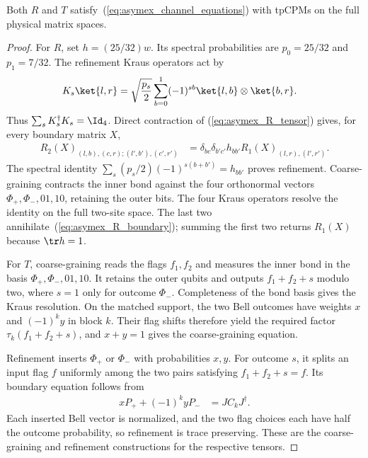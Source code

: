 \begin{lemma}
    \label{thm:asymex_physical_rfp}
    \leanok
    Both $R$ and $T$ satisfy~(\ref{eq:asymex_channel_equations}) with tpCPMs
    on the full physical matrix spaces.
\end{lemma}
\begin{proof}
    \leanok
    For $R$, set $h=(25/32)w$. Its spectral probabilities are
    $p_0=25/32$ and $p_1=7/32$. The refinement Kraus operators act by
    \begin{align}
        K_s\ket{l,r}
         & =\sqrt{\frac{p_s}{2}}\sum_{b=0}^1(-1)^{sb}
        \ket{l,b}\otimes\ket{b,r}.
        \label{eq:asymex_R_refine}
    \end{align}
    Thus $\sum_sK_s^\dagger K_s=\Id_4$. Direct contraction of
    (\ref{eq:asymex_R_tensor}) gives, for every boundary matrix $X$,
    \begin{align}
        R_2(X)_{(l,b),(c,r);(l',b'),(c',r')}
         & =\delta_{bc}\delta_{b'c'}h_{bb'}R_1(X)_{(l,r),(l',r')}.
        \label{eq:asymex_R_boundary}
    \end{align}
    The spectral identity
    $\sum_s(p_s/2)(-1)^{s(b+b')}=h_{bb'}$ proves refinement.
    Coarse-graining contracts the inner bond against the four
    orthonormal vectors $\Phi_+,\Phi_-,01,10$, retaining the outer bits.
    The four Kraus operators resolve the identity on the full two-site
    space. The last two annihilate~(\ref{eq:asymex_R_boundary}); summing
    the first two returns $R_1(X)$ because $\tr h=1$.

    For $T$, coarse-graining reads the flags $f_1,f_2$ and measures the
    inner bond in the basis $\Phi_+,\Phi_-,01,10$. It retains the outer
    qubits and outputs $f_1+f_2+s$ modulo two, where $s=1$ only for
    outcome $\Phi_-$. Completeness of the bond basis gives the Kraus
    resolution. On the matched support, the two Bell outcomes have
    weights $x$ and $(-1)^ky$ in block $k$. Their flag shifts therefore
    yield the required factor $\tau_k(f_1+f_2+s)$, and $x+y=1$ gives
    the coarse-graining equation.

    Refinement inserts $\Phi_+$ or $\Phi_-$ with probabilities $x,y$.
    For outcome $s$, it splits an input flag $f$ uniformly among the
    two pairs satisfying $f_1+f_2+s=f$. Its boundary equation follows
    from
    \begin{align}
        xP_++(-1)^kyP_- & =JC_kJ^\dagger.
        \label{eq:asymex_T_refine_identity}
    \end{align}
    Each inserted Bell vector is normalized, and the two flag choices
    each have half the outcome probability, so refinement is trace
    preserving. These are the coarse-graining and refinement
    constructions for the respective tensors.
\end{proof}

